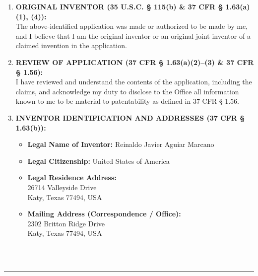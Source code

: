 \documentclass[11pt,letterpaper]{article}
\begin{document}
\begin{enumerate}[leftmargin=*, itemsep=0.5em, topsep=0.2em]
    \item \textbf{ORIGINAL INVENTOR (35 U.S.C. \S{} 115(b) \& 37 CFR \S{} 1.63(a)(1), (4)):} \\
    The above-identified application was made or authorized to be made by me, and I believe that I am the original inventor or an original joint inventor of a claimed invention in the application.

    \item \textbf{REVIEW OF APPLICATION (37 CFR \S{} 1.63(a)(2)--(3) \& 37 CFR \S{} 1.56):} \\
    I have reviewed and understand the contents of the application, including the claims, and acknowledge my duty to disclose to the Office all information known to me to be material to patentability as defined in 37 CFR \S{} 1.56.

    \item \textbf{INVENTOR IDENTIFICATION AND ADDRESSES (37 CFR \S{} 1.63(b)):}
    \begin{itemize}[leftmargin=*, label=$\bullet$, itemsep=0.3em, topsep=0.1em]
        \item \textbf{Legal Name of Inventor:} Reinaldo Javier Aguiar Marcano
        \item \textbf{Legal Citizenship:} United States of America
        \item \textbf{Legal Residence Address:} \\
        26714 Valleyside Drive \\
        Katy, Texas 77494, USA
        \item \textbf{Mailing Address (Correspondence / Office):} \\
        2302 Britton Ridge Drive \\
        Katy, Texas 77494, USA
    \end{itemize}
\end{enumerate}

\newpage
\thispagestyle{empty}

 \\
 \\
\vspace{-0.2cm}\hrule\vspace{0.4cm}
\end{document}
